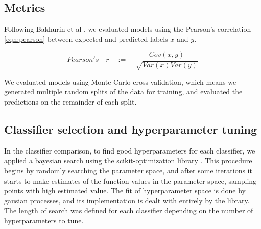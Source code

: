 \subsection{Metrics}
Following Bakhurin et al \cite{bakhurin2017differential}, we evaluated models using the Pearson's correlation \eqref{eqn:pearson} between expected and predicted labels $x$ and $y$. 


\begin{equation}
    Pearson's\quad r  \quad :=  \quad
        \frac{Cov(x,y)}{\sqrt{Var(x)Var(y)}}
    \label{eqn:pearson}
\end{equation}


We evaluated models using Monte Carlo cross validation, which means we generated multiple random splits of the data for training, and evaluated the predictions on the remainder of each split. 

\subsection{Classifier selection and hyperparameter tuning}
In the classifier comparison, to find good hyperparameters for each classifier, we applied a bayesian search using the scikit-optimization library \cite{skopt}. This procedure begins by randomly searching the parameter space, and after some iterations it starts to make estimates of the function values in the parameter space, sampling points with high estimated value. The fit of hyperparameter space is done by gausian processes, and its implementation is dealt with entirely by the library. The length of search was defined for each classifier depending on the number of hyperparameters to tune.%

